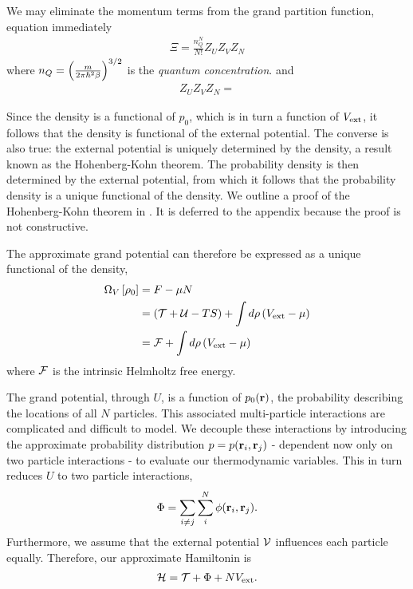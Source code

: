 {We may eliminate the momentum terms from the grand partition function, equation  immediately
\begin{align}
  \Xi = \frac{n_Q^N}{N!} Z_U Z_V Z_N
\end{align}
where $n_Q = \left( \frac{m}{2\pi\hbar^2 \beta} \right)^{3/2}$ is the {\em quantum concentration}.
and 
\begin{align}
  Z_U Z_V Z_N = 
\end{align}





Since the density is a functional of $p_0$, which is in turn a function of $V_{\text{ext}}$,
it follows that the density is functional of the external potential.
The converse is also true:
the external potential is uniquely determined by the density,
a result known as the Hohenberg-Kohn theorem.
The probability density is then determined by the external potential,
from which it follows that the probability density is a unique functional of the density.
We outline a proof of the Hohenberg-Kohn theorem in .
It is deferred to the appendix because the proof is not constructive.

The approximate  grand potential  can therefore be expressed as a unique functional of the density,
\begin{align}
  \Omega_V\left[ \rho_0 \right] &=  F - \mu N \\
  &= \left( {\cal{T}} + {\cal{U}} - TS \right) + \int d\rho\left(  V_{\text{ext}} -\mu  \right)\\
  &= {\cal F} + \int d\rho\left(  V_{\text{ext}} -\mu  \right)\\
\end{align}
where ${\cal F}$ is the intrinsic Helmholtz free energy.



The grand potential, through $U$, is a function of $p_0({\mathbf{\textbf{r}}})$, the  probability describing the locations of all $N$ particles.
This associated multi-particle interactions are complicated and difficult to model.
We decouple these interactions by introducing the approximate probability distribution  $ p = p(\textbf{r}_i, \textbf{r}_j)$ 
- dependent now only on two particle interactions - 
to evaluate our thermodynamic variables.
This in turn reduces $U$ to two particle interactions, 
\begin{align}
  \Phi = \sum_{i\ne j} \sum_i^N \phi(\textbf{r}_i, \textbf{r}_j).
\end{align}
Furthermore, we assume that the external potential ${\cal{V}}$ influences each particle equally.
Therefore, our approximate Hamiltonin is
\begin{align}
{\cal H} = {\cal{T}} + \Phi + NV_{\text{ext}}.
\end{align}


}
